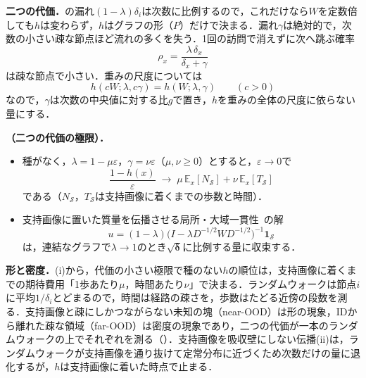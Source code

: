 \appblock
\textbf{二つの代価．}の漏れ$(1-\lambda)\delta_i$は次数に比例するので，これだけなら$W$を定数倍しても$h$は変わらず，$h$はグラフの形（$P$）だけで決まる．漏れ$\gamma$は絶対的で，次数の小さい疎な節点ほど流れの多くを失う．1回の訪問で消えずに次へ跳ぶ確率
\begin{equation*}
\rho_x=\frac{\lambda\,\delta_x}{\delta_x+\gamma}
\end{equation*}
は疎な節点で小さい．重みの尺度については
\begin{equation*}
h(cW;\lambda,c\gamma)=h(W;\lambda,\gamma)\qquad(c>0)
\end{equation*}
なので，$\gamma$は次数の中央値に対する比$g$で置き，$h$を重みの全体の尺度に依らない量にする．

\appblock
\textbf{\TLimits（二つの代価の極限）．}
\begin{itemize}
\item[(i)] 種がなく，$\lambda=1-\mu\varepsilon$，$\gamma=\nu\varepsilon$（$\mu,\nu\ge0$）とすると，$\varepsilon\to0$で
\begin{equation*}
\frac{1-h(x)}{\varepsilon}\;\longrightarrow\;\mu\,\mathbb{E}_x[N_{\mathcal{S}}]+\nu\,\mathbb{E}_x[T_{\mathcal{S}}]
\end{equation*}
である（$N_{\mathcal{S}}$，$T_{\mathcal{S}}$は支持画像に着くまでの歩数と時間）．
\item[(ii)] 支持画像に置いた質量を伝播させる局所・大域一貫性~\cite{zhou2004lgc}の解
\begin{equation*}
u=(1-\lambda)\big(I-\lambda D^{-1/2}WD^{-1/2}\big)^{-1}\mathbf{1}_{\mathcal{S}}
\end{equation*}
は，連結なグラフで$\lambda\to1$のとき$\sqrt{\boldsymbol{\delta}}$に比例する量に収束する．
\end{itemize}

\appblock
\textbf{形と密度．}(i)から，代価の小さい極限で種のない$h$の順位は，支持画像に着くまでの期待費用「1歩あたり$\mu$，時間あたり$\nu$」で決まる．ランダムウォークは節点$i$に平均$1/\delta_i$とどまるので，時間は経路の疎さを，歩数はたどる近傍の段数を測る．支持画像と疎にしかつながらない未知の塊（near-OOD）は形の現象，IDから離れた疎な領域（far-OOD）は密度の現象であり，二つの代価が一本のランダムウォークの上でそれぞれを測る（）．支持画像を吸収壁にしない伝播(ii)は，ランダムウォークが支持画像を通り抜けて定常分布に近づくため次数だけの量に退化するが，$h$は支持画像に着いた時点で止まる．
